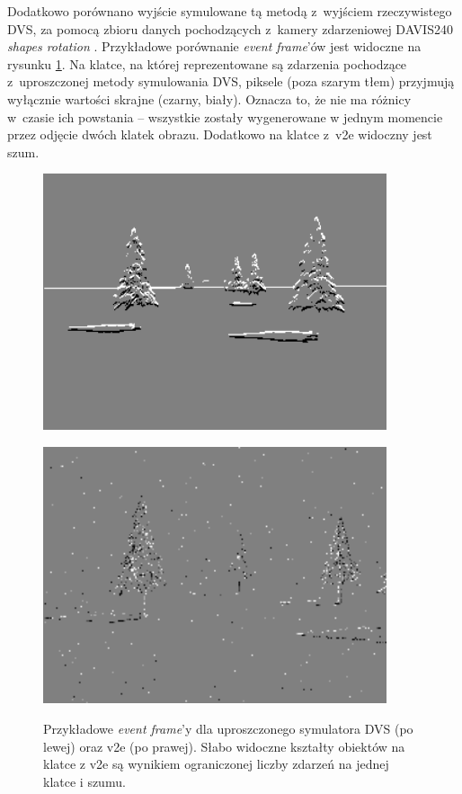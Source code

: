 Dodatkowo porównano wyjście symulowane tą metodą z~wyjściem rzeczywistego DVS, za pomocą zbioru danych pochodzących z~kamery zdarzeniowej DAVIS240 \textit{shapes rotation} \cite{dvs_dataset}. Przykładowe porównanie \textit{event frame}'ów jest widoczne na rysunku \ref{fig:frames_comp}. Na klatce, na której reprezentowane są zdarzenia pochodzące z~uproszczonej metody symulowania DVS, piksele (poza szarym tłem) przyjmują wyłącznie wartości skrajne (czarny, biały). Oznacza to, że nie ma różnicy w~czasie ich powstania -- wszystkie zostały wygenerowane w jednym momencie przez odjęcie dwóch klatek obrazu. Dodatkowo na klatce z~v2e widoczny jest szum.

\begin{figure}
    \centering
    \begin{minipage}{0.5\textwidth}
        \centering
        \includegraphics[width = 0.9\textwidth]{images/my_dvs_frame.png}
        \label{gra:my_dvs_frame}
    \end{minipage}\hfill
    \begin{minipage}{0.5\textwidth}
        \centering
        \includegraphics[width = 0.9\textwidth]{images/v2e_frame.png}
        \label{gra:v2e_frame}
    \end{minipage}
    \caption{Przykładowe \textit{event frame}'y dla uproszczonego symulatora DVS (po lewej) oraz v2e (po prawej). Słabo widoczne kształty obiektów na klatce z v2e są wynikiem ograniczonej liczby zdarzeń na jednej klatce i szumu.}
    \label{fig:frames_comp}
\end{figure}


